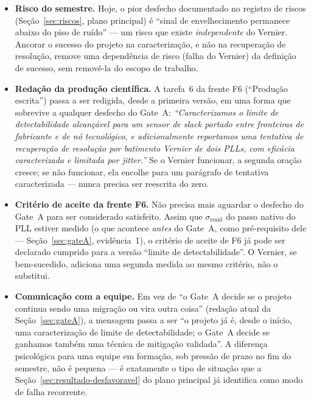 \documentclass[11pt,a4paper]{article}
\begin{document}
\begin{itemize}
  \item \textbf{Risco do semestre.} Hoje, o pior desfecho documentado no registro de
        riscos (Seção~\ref{sec:riscos}, plano principal) é ``sinal de envelhecimento permanece
        abaixo do piso de ruído'' --- um risco que existe \emph{independente} do
        Vernier. Ancorar o sucesso do projeto na caracterização, e não na
        recuperação de resolução, remove uma dependência de risco (falha do
        Vernier) da definição de sucesso, sem removê-la do escopo de trabalho.
  \item \textbf{Redação da produção científica.} A tarefa~6 da frente F6 (``Produção
        escrita'') passa a ser redigida, desde a primeira versão, em uma forma que
        sobrevive a qualquer desfecho do Gate~A: \emph{``Caracterizamos o limite de
        detectabilidade alcançável para um sensor de \emph{slack} portado entre
        fronteiras de fabricante e de nó tecnológico, e adicionalmente reportamos
        uma tentativa de recuperação de resolução por batimento Vernier de dois
        PLLs, com eficácia caracterizada e limitada por \emph{jitter}.''} Se o
        Vernier funcionar, a segunda oração cresce; se não funcionar, ela encolhe
        para um parágrafo de tentativa caracterizada --- nunca precisa ser reescrita
        do zero.
  \item \textbf{Critério de aceite da frente F6.} Não precisa mais aguardar o
        desfecho do Gate~A para ser considerado satisfeito. Assim que
        $\sigma_\text{resid}$ do passo nativo do PLL estiver medido (o que acontece
        \emph{antes} do Gate~A, como pré-requisito dele --- Seção~\ref{sec:gateA}, evidência~1),
        o critério de aceite de F6 já pode ser declarado cumprido para a versão
        ``limite de detectabilidade''. O Vernier, se bem-sucedido, adiciona uma
        segunda medida ao mesmo critério, não o substitui.
  \item \textbf{Comunicação com a equipe.} Em vez de ``o Gate~A decide se o projeto
        continua sendo uma migração ou vira outra coisa'' (redação atual da
        Seção~\ref{sec:gateA}), a mensagem passa a ser ``o projeto já é, desde o início, uma
        caracterização de limite de detectabilidade; o Gate~A decide se ganhamos
        também uma técnica de mitigação validada''. A diferença psicológica para uma
        equipe em formação, sob pressão de prazo no fim do semestre, não é
        pequena --- é exatamente o tipo de situação que a
        Seção~\ref{sec:resultado-desfavoravel} do plano principal já identifica
        como modo de falha recorrente.
\end{itemize}
\end{document}
